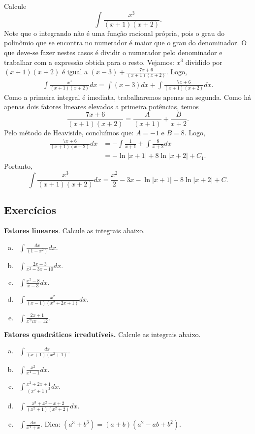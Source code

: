 	\begin{ex}
		Calcule $$\int\frac{x^3}{(x+1)(x+2)}.$$ Note que o integrando não é uma função racional própria, pois o grau do polinômio que se encontra no numerador é maior que o grau do denominador. O que deve-se fazer nestes casos é dividir o numerador pelo denominador e trabalhar com a expressão obtida para o resto. Vejamos: $x^3$ dividido por $(x+1)(x+2)$ é igual a $(x-3) + \frac{7x+6}{(x+1)(x+2)}$. Logo, 
		\[\begin{split}
			\int \frac{x^3}{(x+1)(x+2)}dx = \int (x-3)dx + \int \frac{7x + 6}{(x+1)(x+2)}dx. 
		\end{split}\]
		Como a primeira integral é imediata, trabalharemos apenas na segunda. Como há apenas dois fatores lineares elevados a primeira potências, temos $$\frac{7x + 6}{(x+1)(x+2)} = \frac{A}{(x+1)} + \frac{B}{x+2}.$$ Pelo método de Heaviside, concluímos que: $A = -1$ e $B = 8$. Logo, 
		\[\begin{split}
			\frac{7x+6}{(x+1)(x+2)}dx &= -\int \frac{1}{x+1} + \int \frac{8}{x+2}dx\\
			&= - \ln\left|x+1\right| + 8 \ln \left|x+2\right| + C_1. 
		\end{split}\]
		Portanto, $$\int \frac{x^3}{(x+1)(x+2)}dx = \frac{x^2}{2} -3x - \ln\left|x+1\right| + 8 \ln \left|x+2\right| + C.$$
		
	\end{ex}
	
\subsection*{Exercícios}
	\begin{exer}
		\textbf{Fatores lineares}. Calcule as integrais abaixo.
		\begin{enumerate}[a)]
			\item~$\int \frac{dx}{(1-x^2)}dx$.
			\item~$\int \frac{2x - 3}{x^2-3x-10}dx$.
			\item~$\int \frac{x^2-8}{x-3}dx$.
			\item~$\int \frac{x^2}{(x-1)(x^2 + 2x + 1)}dx$.
			\item~$\int \frac{2x+1}{x^2 7x=12}$.
		\end{enumerate}	
	\end{exer}
	
	\begin{exer}
		\textbf{Fatores quadráticos irredutíveis.} Calcule as integrais abaixo.
		\begin{enumerate}[a)]
			\item~$\int \frac{dx}{(x+1)(x^2+1)}$.
			\item~$\int \frac{x^2}{x^4-1}dx$.
			\item~$\int \frac{x^2+2x+1}{(x^2+1)^2}dx$.
			\item~$\int \frac{x^3 + x^2 + x +2}{(x^2+1)(x^2+2)}dx$.
			\item~$\int \frac{dx}{x^4+x}$. Dica: $(a^3+b^3) = (a+b)(a^2-ab + b^2).$
			
		\end{enumerate}
		
	\end{exer}



